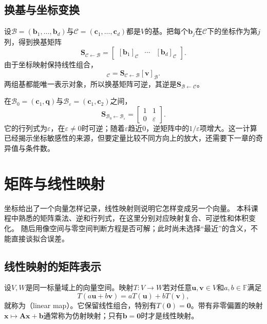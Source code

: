 \subsection{换基与坐标变换}

设$\mathcal{B}=(\bm{b}_1,\ldots,\bm{b}_d)$与$\mathcal{C}=(\bm{c}_1,\ldots,\bm{c}_d)$都是$V$的基。把每个$\bm{b}_j$在$\mathcal{C}$下的坐标作为第$j$列，得到换基矩阵
\[
  \bm{S}_{\mathcal{C}\leftarrow\mathcal{B}}
  =
  \begin{bmatrix} [\bm{b}_1]_{\mathcal{C}} & \cdots & [\bm{b}_d]_{\mathcal{C}} \end{bmatrix}.
\]
由于坐标映射保持线性组合，
\begin{equation}
  [\bm{v}]_{\mathcal{C}} = \bm{S}_{\mathcal{C}\leftarrow\mathcal{B}} [\bm{v}]_{\mathcal{B}}. \label{eq:linear-algebra-coordinate-change}
\end{equation}
两组基都能唯一表示对象，所以换基矩阵可逆，其逆是$\bm{S}_{\mathcal{B}\leftarrow\mathcal{C}}$。

在$\mathcal{B}_0=(\bm{c}_1,\bm{q})$与$\mathcal{B}_{\varepsilon}=(\bm{c}_1,\bm{c}_2)$之间，
\[
  \bm{S}_{\mathcal{B}_0\leftarrow\mathcal{B}_{\varepsilon}}
  =
  \begin{bmatrix} 1 & 1\\ 0 & \varepsilon \end{bmatrix}.
\]
它的行列式为$\varepsilon$，在$\varepsilon\neq0$时可逆；随着$\varepsilon$趋近$0$，逆矩阵中的$1/\varepsilon$项增大。这一计算已经揭示坐标敏感性的来源，但要定量比较不同方向上的放大，还需要下一章的奇异值与条件数。

\section{矩阵与线性映射}
\label{sec:linear-algebra-matrices-linear-maps}

坐标给出了一个向量怎样记录，线性映射则说明它怎样变成另一个向量。
本科课程中熟悉的矩阵乘法、逆和行列式，在这里分别对应映射复合、可逆性和体积变化。
随后用像空间与零空间判断方程是否可解；此时尚未选择“最近”的含义，不能直接谈拟合误差。

\subsection{线性映射的矩阵表示}

设$V,W$是同一标量域上的向量空间。映射$T:V\to W$若对任意$\bm{u},\bm{v}\in V$和$a,b\in\mathbb{F}$满足
\[
  T(a\bm{u}+b\bm{v})
  =
  aT(\bm{u})+bT(\bm{v}),
\]
就称为（linear map）。它保留线性组合，特别有$T(\bm{0})=\bm{0}$。带有非零偏置的映射$\bm{x}\mapsto\bm{A}\bm{x}+\bm{b}$通常称为仿射映射；只有$\bm{b}=\bm{0}$时才是线性映射。

